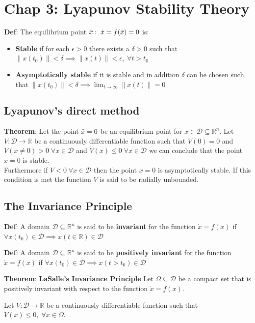 \section{Chap 3: Lyapunov Stability Theory}
\textbf{Def}: The equilibrium point $\Bar{x}: \; \Dot{x} = f(\Bar{x}) = 0$ is:
\begin{itemize}
    \item \textbf{Stable} if for each $\epsilon > 0$ there exists a $\delta > 0$ such that $\lVert x(t_0) \rVert < \delta \implies \lVert x(t) \rVert < \epsilon , \; \forall t>t_0 $
    \item \textbf{Asymptotically stable} if it is stable and in addition $\delta$ can be chosen such that $\lVert x(t_0) \rVert < \delta \implies \lim_{t \to \infty} \lVert x(t) \rVert = 0$
\end{itemize}
\subsection{Lyapunov's direct method}
\textbf{Theorem}: Let the point $\Bar{x} = 0$ be an equilibrium point for $x\in \mathcal{D} \subseteq \mathbb{R}^n$. Let $V: \mathcal{D} \to \mathbb{R}$ be a continuously differentiable function such that $V(0) = 0$ and $V(x \neq 0) > 0 \; \forall x \in \mathcal{D}$ and $\Dot{V}(x) \le 0 \; \forall x \in \mathcal{D}$ we can conclude that the point $x=0$ is stable. \\Furthermore if $\Dot{V} < 0 \; \forall x \in \mathcal{D}$ then the point $x=0$ is asymptotically stable. If this condition is met the function $V$ is said to be radially unbounded.
\subsection{The Invariance Principle}
\textbf{Def}: A domain $\mathcal{D} \subseteq \mathbb{R}^n$ is said to be \textbf{invariant} for the function $\Dot{x} = f(x)$ if $\forall x(t_0)\in \mathcal{D} \implies x(t \in \mathbb{R})\in \mathcal{D}$

\newpar{}
\textbf{Def}: A domain $\mathcal{D} \subseteq \mathbb{R}^n$ is said to be \textbf{positively invariant} for the function $\Dot{x} = f(x)$ if $\forall x(t_0)\in \mathcal{D} \implies x(t > t_0)\in \mathcal{D}$

\newpar{}
\textbf{Theorem}: \textbf{LaSalle's Invariance Principle} Let $\Omega \subseteq \mathcal{D}$ be a compact set that is positively invariant with respect to the function $\Dot{x} = f(x)$.

Let $V: \mathcal{D} \to \mathbb{R}$ be a continuously differentiable function such that $\Dot{V}(x) \le 0, \; \forall x\in \Omega$.

